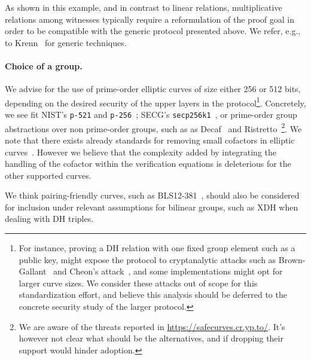 \documentclass[runningheads,11pt]{article}
\begin{document}
As shown in this example, and in contrast to linear relations, multiplicative relations among witnesses typically require a reformulation of the proof goal in order to be compatible with the generic protocol presented above.
We refer, e.g., to Krenn~\cite{krenn12} for generic techniques.




\paragraph{Choice of a group.} We advise for the use of prime-order elliptic curves of size either 256 or 512 bits, depending on the desired security of the upper layers in the protocol\footnote{For instance, proving a DH relation with one fixed group element such as a public key, might expose the protocol to cryptanalytic attacks such as Brown-Gallant~\cite{EPRINT:BroGal04} and Cheon’s attack~\cite{EC:Cheon06}, and some implementations might opt for larger curve sizes. We consider these attacks out of scope for this standardization effort, and believe this analysis should be deferred to the concrete security study of the larger protocol.}.
Concretely, we see fit NIST's \verb|p-521| and \verb|p-256|~\cite{fips2}; SECG's \verb|secp256k1|~\cite{SECG}, or prime-order group abstractions over non prime-order groups, such as as Decaf~\cite{C:Hamburg15} and Ristretto~\cite{cfrg-ristretto-decaf}\footnote{We are aware of the threats reported in
\url{https://safecurves.cr.yp.to/}.
It's however not clear what should be the alternatives, and if dropping their support would hinder adoption.
}.
We note that there exists already standards for removing small cofactors in elliptic curves~\cite{rfc2785}.
However we believe that the complexity added by integrating the handling of the cofactor within the verification equations is deleterious for the other supported curves.

We think pairing-friendly curves, such as BLS12-381~\cite{bls12}, should also be considered for inclusion under relevant assumptions for bilinear groups, such as XDH when dealing with DH triples.
\end{document}
